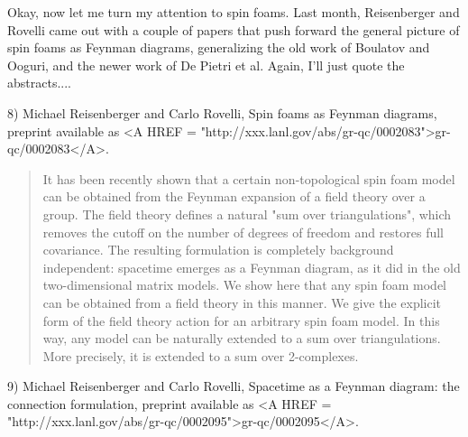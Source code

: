 Okay, now let me turn my attention to spin foams.  Last month, 
Reisenberger and Rovelli came out with a couple of papers that push
forward the general picture of spin foams as Feynman diagrams, 
generalizing the old work of Boulatov and Ooguri, and the newer
work of De Pietri et al.  Again, I'll just quote the abstracts....

8) Michael Reisenberger and Carlo Rovelli, Spin foams as Feynman diagrams,
preprint available as <A HREF = "http://xxx.lanl.gov/abs/gr-qc/0002083">gr-qc/0002083</A>.

\begin{quote}
     It has been recently shown that a certain non-topological spin foam
     model can be obtained from the Feynman expansion of a field theory
     over a group. The field theory defines a natural "sum over
     triangulations", which removes the cutoff on the number of
     degrees of freedom and restores full covariance. The resulting
     formulation is completely background independent: spacetime emerges
     as a Feynman diagram, as it did in the old two-dimensional matrix
     models. We show here that any spin foam model can be obtained from
     a field theory in this manner. We give the explicit form of the
     field theory action for an arbitrary spin foam model. In this way,
     any model can be naturally extended to a sum over triangulations. 
     More precisely, it is extended to a sum over 2-complexes.
\end{quote}
9) Michael Reisenberger and Carlo Rovelli, Spacetime as a Feynman diagram:
the connection formulation, preprint available as <A HREF = "http://xxx.lanl.gov/abs/gr-qc/0002095">gr-qc/0002095</A>.

